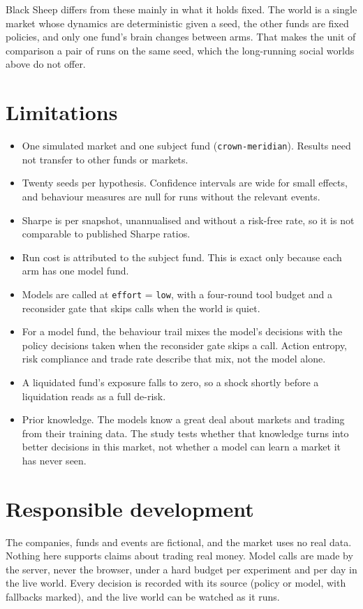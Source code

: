 \documentclass[11pt]{article}
\begin{document}
Black Sheep differs from these mainly in what it holds fixed. The world is a single market whose dynamics are deterministic given a seed, the other funds are fixed policies, and only one fund's brain changes between arms. That makes the unit of comparison a pair of runs on the same seed, which the long-running social worlds above do not offer.

\section{Limitations}
\begin{itemize}
\item One simulated market and one subject fund (\texttt{crown-meridian}). Results need not transfer to other funds or markets.
\item Twenty seeds per hypothesis. Confidence intervals are wide for small effects, and behaviour measures are null for runs without the relevant events.
\item Sharpe is per snapshot, unannualised and without a risk-free rate, so it is not comparable to published Sharpe ratios.
\item Run cost is attributed to the subject fund. This is exact only because each arm has one model fund.
\item Models are called at \texttt{effort} = \texttt{low}, with a four-round tool budget and a reconsider gate that skips calls when the world is quiet.
\item For a model fund, the behaviour trail mixes the model's decisions with the policy decisions taken when the reconsider gate skips a call. Action entropy, risk compliance and trade rate describe that mix, not the model alone.
\item A liquidated fund's exposure falls to zero, so a shock shortly before a liquidation reads as a full de-risk.
\item Prior knowledge. The models know a great deal about markets and trading from their training data. The study tests whether that knowledge turns into better decisions in this market, not whether a model can learn a market it has never seen.
\end{itemize}

\section{Responsible development}
The companies, funds and events are fictional, and the market uses no real data. Nothing here supports claims about trading real money. Model calls are made by the server, never the browser, under a hard budget per experiment and per day in the live world. Every decision is recorded with its source (policy or model, with fallbacks marked), and the live world can be watched as it runs.
\end{document}
